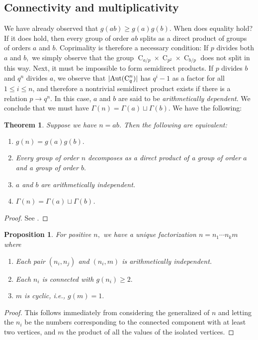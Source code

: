 \documentclass{article}
\DeclarePairedDelimiter\abs{\lvert}{\rvert}
\newcommand{\aut}[1]{\operatorname{Aut}(#1)}
\newcommand{\cyc}[1]{\operatorname{C}_{#1}}
\theoremstyle{plain}
\newtheorem{thm}{Theorem}[section]
\newtheorem{prop}{Proposition}[section]
\theoremstyle{definition}
\begin{document}
\subsection{Connectivity and multiplicativity}
We have already observed that $g(ab) \ge g(a)g(b).$ When does equality hold? If it does hold, then every group of order $ab$ splits as a direct product of groups of orders $a$ and $b.$ Coprimality is therefore a necessary condition: If $p$ divides both $a$ and $b,$ we simply observe that the group $\cyc{a/p} \times \cyc{p^2} \times \cyc{b/p}$ does not split in this way. Next, it must be impossible to form semidirect products. If $p$ divides $b$ and $q^n$ divides $a$, we observe that $\abs{\aut{\cyc{q}^n}}$ has $q^i - 1$ as a factor for all $1 \le i \le n$, and therefore a nontrivial semidirect product exists if there is a relation $p \rightarrow q^n.$ In this case, $a$ and $b$ are said to be \emph{arithmetically dependent}. We conclude that we must have $\Gamma(n) = \Gamma(a) \sqcup \Gamma(b)$.  We have the following:

\begin{thm}
	Suppose we have $n = ab$. Then the following are equivalent:
	\begin{enumerate}
		\item $g(n) = g(a)g(b).$
		\item Every group of order $n$ decomposes as a direct product of a group of order $a$ and a group of order $b.$
		\item $a$ and $b$ are arithmetically independent.
		\item $\Gamma(n) = \Gamma(a) \sqcup \Gamma(b)$.
	\end{enumerate}
\end{thm}
\begin{proof}
	See {\cite[Lem.~21.19]{monolith}}.
\end{proof}

\begin{prop}
	For positive $n,$ we have a unique factorization $n = n_1 \cdots n_k m$ where\pagebreak[3]
	\begin{enumerate} \listspace
		\item Each pair $(n_i, n_j)$ and $(n_i, m)$ is arithmetically independent.
		\item Each $n_i$ is connected with $g(n_i) \ge 2.$
		\item $m$ is cyclic, i.e., $g(m) = 1.$
	\end{enumerate} \textspace
\end{prop}
\begin{proof}
	This follows immediately from considering the generalized  of $n$ and letting the $n_i$ be the numbers corresponding to the connected component with at least two vertices, and $m$ the product of all the values of the isolated vertices.
\end{proof}
\end{document}
